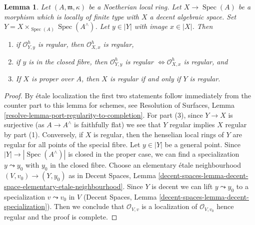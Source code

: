 \documentclass{stacks-project}
\theoremstyle{plain}
\newtheorem{lemma}[subsection]{Lemma}
\theoremstyle{definition}
\theoremstyle{remark}
\numberwithin{equation}{subsection}
\def\Spec{\mathop{\mathrm{Spec}}}
\begin{document}
\begin{lemma}
\label{lemma-port-regularity-to-completion}
Let $(A, \mathfrak m, \kappa)$ be a Noetherian local ring.
Let $X \to \Spec(A)$ be a morphism which is locally of finite type
with $X$ a decent algebraic space. Set
$Y = X \times_{\Spec(A)} \Spec(A^\wedge)$. Let $y \in |Y|$
with image $x \in |X|$. Then
\begin{enumerate}
\item if $\mathcal{O}_{Y, y}^h$ is regular, then
$\mathcal{O}_{X, x}^h$ is regular,
\item if $y$ is in the closed fibre, then $\mathcal{O}_{Y, y}^h$ is regular
$\Leftrightarrow \mathcal{O}_{X, x}^h$ is regular, and
\item If $X$ is proper over $A$, then $X$ is regular
if and only if $Y$ is regular.
\end{enumerate}
\end{lemma}

\begin{proof}
By \'etale localization the first two statements follow
immediately from the counter part to this lemma for schemes, see
Resolution of Surfaces, Lemma \ref{resolve-lemma-port-regularity-to-completion}.
For part (3), since $Y \to X$ is surjective (as $A \to A^\wedge$
is faithfully flat) we see that $Y$ regular implies $X$ regular
by part (1). Conversely, if $X$ is regular, then the henselian
local rings of $Y$ are regular for all points of the special fibre.
Let $y \in |Y|$ be a general point.
Since $|Y| \to |\Spec(A^\wedge)|$ is closed in the proper
case, we can find a specialization $y \leadsto y_0$ with
$y_0$ in the closed fibre. Choose an elementary \'etale
neighbourhood $(V, v_0) \to (Y, y_0)$ as in
Decent Spaces, Lemma
\ref{decent-spaces-lemma-decent-space-elementary-etale-neighbourhood}.
Since $Y$ is decent we can lift $y \leadsto y_0$ to a specialization
$v \leadsto v_0$ in $V$
(Decent Spaces, Lemma \ref{decent-spaces-lemma-decent-specialization}).
Then we conclude that
$\mathcal{O}_{V, v}$ is a localization of $\mathcal{O}_{V, v_0}$
hence regular and the proof is complete.
\end{proof}
\end{document}
